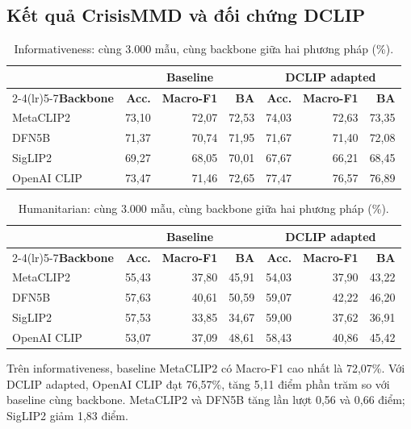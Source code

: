 \documentclass[12pt,a4paper]{article}
\begin{document}
\subsection{Kết quả CrisisMMD và đối chứng DCLIP}
\begin{table}[H]\centering\small
\caption{Informativeness: cùng 3.000 mẫu, cùng backbone giữa hai phương pháp (\%).}\label{tab:crisis-info}
\begin{tabular}{lrrrrrr}\toprule
&\multicolumn{3}{c}{\textbf{Baseline}}&\multicolumn{3}{c}{\textbf{DCLIP adapted}}\\\cmidrule(lr){2-4}\cmidrule(lr){5-7}\textbf{Backbone}&\textbf{Acc.}&\textbf{Macro-F1}&\textbf{BA}&\textbf{Acc.}&\textbf{Macro-F1}&\textbf{BA}\\\midrule
MetaCLIP2&73,10&72,07&72,53&74,03&72,63&73,35\\
DFN5B&71,37&70,74&71,95&71,67&71,40&72,08\\
SigLIP2&69,27&68,05&70,01&67,67&66,21&68,45\\
OpenAI CLIP&73,47&71,46&72,65&77,47&76,57&76,89\\
\bottomrule\end{tabular}\end{table}
\begin{table}[H]\centering\small
\caption{Humanitarian: cùng 3.000 mẫu, cùng backbone giữa hai phương pháp (\%).}\label{tab:crisis-human}
\begin{tabular}{lrrrrrr}\toprule
&\multicolumn{3}{c}{\textbf{Baseline}}&\multicolumn{3}{c}{\textbf{DCLIP adapted}}\\\cmidrule(lr){2-4}\cmidrule(lr){5-7}\textbf{Backbone}&\textbf{Acc.}&\textbf{Macro-F1}&\textbf{BA}&\textbf{Acc.}&\textbf{Macro-F1}&\textbf{BA}\\\midrule
MetaCLIP2&55,43&37,80&45,91&54,03&37,90&43,22\\
DFN5B&57,63&40,61&50,59&59,07&42,22&46,20\\
SigLIP2&57,53&33,85&34,67&59,00&37,62&36,91\\
OpenAI CLIP&53,07&37,09&48,61&58,43&40,86&45,42\\
\bottomrule\end{tabular}\end{table}

Trên informativeness, baseline MetaCLIP2 có Macro-F1 cao nhất là 72,07\%. Với DCLIP adapted, OpenAI CLIP đạt 76,57\%, tăng 5,11 điểm phần trăm so với baseline cùng backbone. MetaCLIP2 và DFN5B tăng lần lượt 0,56 và 0,66 điểm; SigLIP2 giảm 1,83 điểm.
\end{document}
